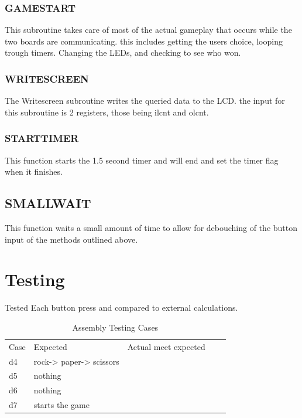 \documentclass[12pt,letterpaper]{article}
\begin{document}
	\subsubsection{GAMESTART}
	This subroutine takes care of most of the actual gameplay that occurs while the two boards are communicating. this includes getting the users choice, looping trough timers. Changing the LEDs, and checking to see who won.
	 
	
	\subsubsection{WRITESCREEN}
	The Writescreen subroutine writes the queried data to the LCD. the input for this subroutine is 2 registers, those being ilcnt and olcnt.
	
	\subsubsection{STARTTIMER}
	This function starts the 1.5 second timer and will end and set the timer flag when it finishes. 
	
	\subsection{SMALLWAIT}
	This function waits a small amount of time to allow for debouching of the button input of the methods outlined above.
	

\section{Testing}
Tested Each button press and compared to external calculations.
\begin{table}[h]
	\centering
	\begin{tabular}{|l|l|l|ll}
		\cline{1-3}
		Case & Expected & Actual meet expected &  &  \\ \cline{1-3}
	d4	&rock-> paper-> scissors&	\checkmark  &  \\ \cline{1-3}
	d5	&nothing&	\checkmark	&  \\ \cline{1-3}
	d6	&nothing&	\checkmark  &  \\ \cline{1-3}
	d7	&starts the game&	\checkmark	&  \\ \cline{1-3}
	
	\end{tabular}
\caption{Assembly Testing Cases}
\end{table}
\end{document}
